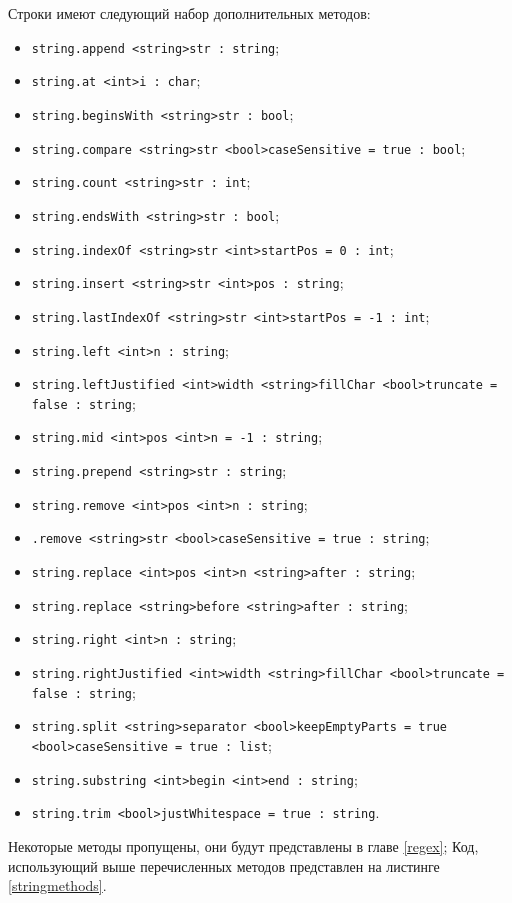 \documentclass[a4paper, 14pt]{extarticle}
\newenvironment{icItems}
	{ \begin{itemize} [noitemsep,nolistsep] }
	{ \end{itemize} }
\begin{document}
Строки имеют следующий набор дополнительных методов:
\begin{icItems}
\item
	\lstinline|string.append <string>str : string|;
\item
	\lstinline|string.at <int>i : char|;
\item
	\lstinline|string.beginsWith <string>str : bool|;
\item
	\lstinline|string.compare <string>str <bool>caseSensitive = true : bool|;
\item
	\lstinline|string.count <string>str : int|;
\item
	\lstinline|string.endsWith <string>str : bool|;
\item
	\lstinline|string.indexOf <string>str <int>startPos = 0 : int|;
\item
	\lstinline|string.insert <string>str <int>pos : string|;
\item
	\lstinline|string.lastIndexOf <string>str <int>startPos = -1 : int|;
\item
	\lstinline|string.left <int>n : string|;
\item
	\lstinline|string.leftJustified <int>width <string>fillChar <bool>truncate = false : string|;
\item
	\lstinline|string.mid <int>pos <int>n = -1 : string|;
\item
	\lstinline|string.prepend <string>str : string|;
\item
	\lstinline|string.remove <int>pos <int>n : string|;
\item
	\lstinline|.remove <string>str <bool>caseSensitive = true : string|;
\item
	\lstinline|string.replace <int>pos <int>n <string>after : string|;
\item
	\lstinline|string.replace <string>before <string>after : string|;
\item
	\lstinline|string.right <int>n : string|;
\item
	\lstinline|string.rightJustified <int>width <string>fillChar <bool>truncate = false : string|;
\item
	\lstinline|string.split <string>separator <bool>keepEmptyParts = true <bool>caseSensitive = true : list|;
\item
	\lstinline|string.substring <int>begin <int>end : string|;
\item
	\lstinline|string.trim <bool>justWhitespace = true : string|.
\end{icItems}

Некоторые методы пропущены, они будут представлены в главе \ref{regex}; Код, использующий выше перечисленных методов представлен на листинге \ref{stringmethods}.
\end{document}
